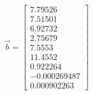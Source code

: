 \begin{equation} \Vec{b} = \begin{bmatrix}      7.79526\\      7.51501\\      6.92732\\      2.75679\\       7.5553\\      11.4552\\     0.922264\\ -0.000269487\\  0.000902263 \end{bmatrix} \label{eqsol} \end{equation}
